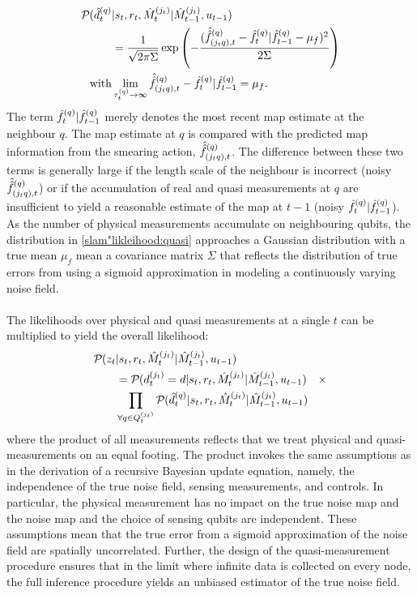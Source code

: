 \begin{align}
\mathcal{P}_{} (  \hat{d}^{( q )}_{t}&|s_{ t}, r_{ t}, \hat{M}_t^{(j_t)}| \hat{M}_{t-1}^{(j_t)}, u_{t-1 } ) \nonumber \\
& = \frac{1}{\sqrt{2\pi \Sigma}} \exp \left( -\frac{( \hat{\hat{f}}^{(q)}_{(j_tq),t} - \hat{f}^{( q )}_{t}|\hat{f}^{( q )}_{t-1} - \mu_f )^2}{2 \Sigma }\right) \label{slam"likleihood:quasi}  \\
\mathrm{with } & \lim_{\tau_t^{(q)} \to \infty} \hat{\hat{f}}^{(q)}_{(j_tq),t} - \hat{f}^{( q )}_{t}|\hat{f}^{( q )}_{t-1}   = \mu_f.
\end{align} The term $\hat{f}^{( q )}_{t}|\hat{f}^{( q )}_{t-1} $ merely denotes the most recent map estimate at the neighbour $q$. The map estimate at $q$ is compared with the predicted map information from the smearing action, $\hat{\hat{f}}^{(q)}_{(j_tq),t}$. The difference between these two terms is generally large if the length scale of the neighbour is incorrect  (noisy $ \hat{\hat{f}}^{(q)}_{(j_tq),t}$) or if the accumulation of real and quasi measurements at $q$ are insufficient to yield a reasonable estimate of the map at $t-1$  (noisy $ \hat{f}^{( q )}_{t}|\hat{f}^{( q )}_{t-1} $).  As the number of physical measurements accumulate on neighbouring qubits, the distribution in \cref{slam"likleihood:quasi} approaches a Gaussian  distribution with a true mean $\mu_f$ mean a covariance matrix $\Sigma$ that reflects the distribution of true errors from using a sigmoid approximation in modeling a continuously varying noise field.\\
\\ The likelihoods over physical and quasi measurements at a single $t$ can be multiplied to yield the overall likelihood:
\begin{align}
	\mathcal{P}_{} (  z_t& | s_{ t}, r_{ t}, \hat{M}_t^{(j_t)}| \hat{M}_{t-1}^{(j_t)}, u_{t-1 }  ) \nonumber \\
	&= \mathcal{P}_{} ( d^{( j_t )}_{t}=d | s_{ t}, r_{ t}, \hat{M}_t^{(j_t)}| \hat{M}_{t-1}^{(j_t)}, u_{t-1} ) \quad  \times \nonumber \\
	& \prod_{\forall q \in Q^{( j_t )}_{t}} \mathcal{P}_{} (  \hat{d}^{( q )}_{t}|s_{ t}, r_{ t}, \hat{M}_t^{(j_t)}| \hat{M}_{t-1}^{(j_t)}, u_{t-1 } )
\end{align} where the product of all measurements reflects that we treat physical and quasi-measurements on  an equal footing. The product invokes the same assumptions as in the derivation of a recursive Bayesian update equation, namely, the independence of the true noise field, sensing measurements, and controls. In particular, the physical measurement has no impact on the true noise map and the noise map and the choice of sensing qubits are independent. These assumptions mean that the true error from a sigmoid approximation of the noise field are spatially uncorrelated. Further, the design of the quasi-measurement procedure ensures that in the limit where infinite data is collected on every node, the full inference procedure yields an unbiased estimator of the true noise field. \\
